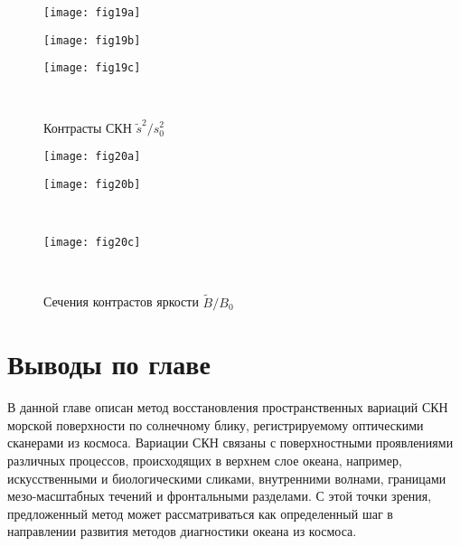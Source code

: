 \begin{figure}[!thb]
    	\centering
	\begin{minipage}{.31\textwidth}
	    \subcaptionbox{\label{fig:19a}}
		{\texttt{[image: fig19a]}}
	\end{minipage}
	\hfill
	\begin{minipage}{.31\textwidth}
	    \subcaptionbox{\label{fig:19b}}
		{\texttt{[image: fig19b]}}
	\end{minipage}
	\hfill
	\begin{minipage}{.31\textwidth}
	    \subcaptionbox{\label{fig:19c}}
		{\texttt{[image: fig19c]}}
	\end{minipage}
	\\
    \caption{Контрасты СКН $\tilde{s}^{2} /s_{0}^{2} $}
    \label{fig:19}
\end{figure}


\begin{figure}[!t]
    	\centering
	\begin{minipage}{.47\textwidth}
	    \subcaptionbox{\label{fig:20a}}
		{\texttt{[image: fig20a]}}
	\end{minipage}
	\hfill
	\begin{minipage}{.47\textwidth}
	    \subcaptionbox{\label{fig:20b}}
		{\texttt{[image: fig20b]}}
	\end{minipage}
	\hfill
	\\
	\begin{minipage}{.47\textwidth}
	    \subcaptionbox{\label{fig:20c}}
		{\texttt{[image: fig20c]}}
	\end{minipage}
	\\
    \caption{Сечения контрастов яркости $\tilde{B}/B_{0}$}
    \label{fig:20}
\end{figure}


\newpage


\section{Выводы по главе}

В данной главе описан метод восстановления пространственных вариаций СКН морской поверхности по солнечному блику, регистрируемому оптическими сканерами из космоса. Вариации СКН связаны с поверхностными проявлениями различных процессов, происходящих в верхнем слое океана, например, искусственными и биологическими сликами, внутренними волнами, границами мезо-масштабных течений и фронтальными разделами. С этой точки зрения, предложенный метод может рассматриваться как определенный шаг в направлении развития методов диагностики океана из космоса.

